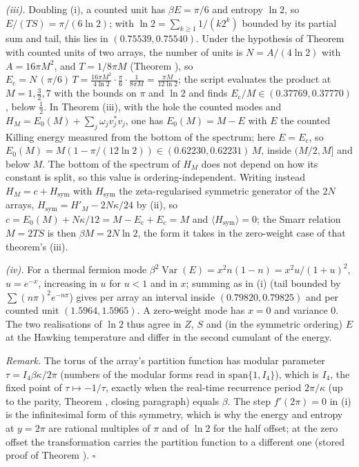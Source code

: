 \emph{(iii).} Doubling (i), a counted unit has $\beta E = \pi/6$ and entropy $\ln 2$, so $E/(TS) = \pi/(6\ln 2)$; with $\ln 2 = \sum_{k \geq 1}1/(k2^{k})$ bounded by its partial sum and tail, this lies in $(0.75539, 0.75540)$. Under the hypothesis of Theorem  with counted units of two arrays, the number of units is $N = A/(4\ln 2)$ with $A = 16\pi M^{2}$, and $T = 1/8\pi M$ (Theorem ), so $E_{\mathrm{c}} = N\,(\pi/6)\,T = \frac{16\pi M^{2}}{4\ln 2}\cdot\frac{\pi}{6}\cdot\frac{1}{8\pi M} = \frac{\pi M}{12\ln 2}$; the script evaluates the product at $M = 1, \tfrac32, 7$ with the bounds on $\pi$ and $\ln 2$ and finds $E_{\mathrm{c}}/M \in (0.37769, 0.37770)$, below $\tfrac12$. In Theorem (iii), with the hole the counted modes and $H_{M} = E_{0}(M) + \sum_{j}\omega_{j}v_{j}^{*}v_{j}$, one has $E_{0}(M) = M - E$ with $E$ the counted Killing energy measured from the bottom of the spectrum; here $E = E_{\mathrm{c}}$, so $E_{0}(M) = M(1 - \pi/(12\ln 2)) \in (0.62230, 0.62231)\,M$, inside $(M/2, M]$ and below $M$. The bottom of the spectrum of $H_{M}$ does not depend on how its constant is split, so this value is ordering-independent. Writing instead $H_{M} = c + H_{\mathrm{sym}}$ with $H_{\mathrm{sym}}$ the zeta-regularised symmetric generator of the $2N$ arrays, $H_{\mathrm{sym}} = H'_{M} - 2N\kappa/24$ by (ii), so $c = E_{0}(M) + N\kappa/12 = M - E_{\mathrm{c}} + E_{\mathrm{c}} = M$ and $\langle H_{\mathrm{sym}}\rangle = 0$; the Smarr relation $M = 2TS$ is then $\beta M = 2N\ln 2$, the form it takes in the zero-weight case of that theorem's (iii).

\emph{(iv).} For a thermal fermion mode $\beta^{2}\operatorname{Var}(E) = x^{2}n(1 - n) = x^{2}u/(1 + u)^{2}$, $u = e^{-x}$, increasing in $u$ for $u < 1$ and in $x$; summing as in (i) (tail bounded by $\sum (n\pi)^{2}e^{-n\pi}$) gives per array an interval inside $(0.79820, 0.79825)$ and per counted unit $(1.5964, 1.5965)$. A zero-weight mode has $x = 0$ and variance $0$. The two realisations of $\ln 2$ thus agree in $Z$, $S$ and (in the symmetric ordering) $E$ at the Hawking temperature and differ in the second cumulant of the energy.

\emph{Remark.} The torus of the array's partition function has modular parameter $\tau = I_4\beta\kappa/2\pi$ (numbers of the modular forms read in $\mathrm{span}\{1, I_4\}$), which is $I_4$, the fixed point of $\tau \mapsto -1/\tau$, exactly when the real-time recurrence period $2\pi/\kappa$ (up to the parity, Theorem , closing paragraph) equals $\beta$. The step $f'(2\pi) = 0$ in (i) is the infinitesimal form of this symmetry, which is why the energy and entropy at $y = 2\pi$ are rational multiples of $\pi$ and of $\ln 2$ for the half offset; at the zero offset the transformation carries the partition function to a different one (stored proof of Theorem ). $\square$
